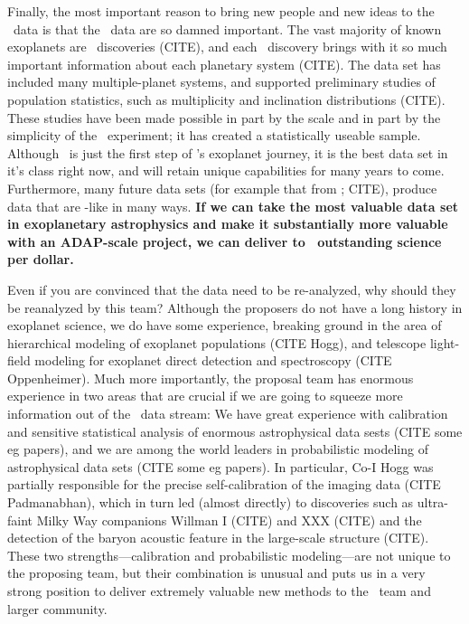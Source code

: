 \documentclass[letterpaper,12pt,preprint]{hack_aastex}
\begin{document}
Finally, the most important reason to bring new people and new ideas
to the \Kepler\ data is that the \Kepler\ data are so damned
important.  The vast majority of known exoplanets are
\Kepler\ discoveries (CITE), and each \Kepler\ discovery brings with
it so much important information about each planetary system (CITE).
The data set has included many multiple-planet systems, and supported
preliminary studies of population statistics, such as multiplicity and
inclination distributions (CITE).  These studies have been made
possible in part by the scale and in part by the simplicity of the
\Kepler\ experiment; it has created a statistically useable sample.
Although \Kepler\ is just the first step of \NASA's exoplanet journey,
it is the best data set in it's class right now, and will retain
unique capabilities for many years to come.  Furthermore, many future
data sets (for example that from \TESS; CITE), produce data that are
\Kepler-like in many ways.  \textbf{If we can take the most valuable
  data set in exoplanetary astrophysics and make it substantially more
  valuable with an ADAP-scale project, we can deliver to
  \NASA\ outstanding science per dollar.}

Even if you are convinced that the data need to be re-analyzed, why
should they be reanalyzed by this team?  Although the proposers do not
have a long history in exoplanet science, we do have some experience,
breaking ground in the area of hierarchical modeling of exoplanet
populations (CITE Hogg), and telescope light-field modeling for
exoplanet direct detection and spectroscopy (CITE Oppenheimer).  Much
more importantly, the proposal team has enormous experience in two
areas that are crucial if we are going to squeeze more information out
of the \Kepler\ data stream: We have great experience with calibration
and sensitive statistical analysis of enormous astrophysical data
sests (CITE some eg papers), and we are among the world leaders in
probabilistic modeling of astrophysical data sets (CITE some eg
papers).  In particular, Co-I Hogg was partially responsible for the
precise self-calibration of the 
imaging data (CITE Padmanabhan), which in turn led (almost directly)
to discoveries such as ultra-faint Milky Way companions Willman I
(CITE) and XXX (CITE) and the detection of the baryon acoustic feature
in the large-scale structure (CITE).  These two
strengths---calibration and probabilistic modeling---are not unique to
the proposing team, but their combination is unusual and puts us in a
very strong position to deliver extremely valuable new methods to the
\Kepler\ team and larger community.
\end{document}
